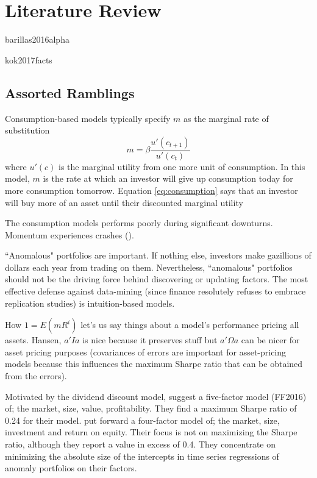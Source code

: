 
\section{Literature Review}

{barillas2016alpha}

{kok2017facts}

\subsection{Assorted Ramblings}

Consumption-based models typically specify $m$ as the marginal rate of 
substitution
\begin{equation}
\label{eq:consumption}
m=\beta\frac{u'(c_{t+1})}{u'(c_t)}
\end{equation}
where $u'(c)$ is the marginal utility from one more unit of consumption.
In this model, $m$ is the rate at which an investor will give up consumption 
today for more consumption tomorrow.
Equation \ref{eq:consumption} says that an investor will buy more of an asset 
until their discounted marginal utility

The consumption models performs poorly during significant downturns.
Momentum experiences crashes (\parencite{daniel2016momentum}).

``Anomalous" portfolios are important.
If nothing else, investors make gazillions of dollars each year from trading 
on them.
Nevertheless, ``anomalous" portfolios should not be the driving force behind 
discovering or updating factors.
The most effective defense against data-mining (since finance resolutely 
refuses to embrace replication studies) is intuition-based models.

How $1=E(mR^i)$ let's us say things about a model's performance pricing all 
assets.
Hansen, $a'Ia$ is nice because it preserves stuff but
$a'\Omega a$ can be nicer for asset pricing purposes (covariances of errors 
are important for asset-pricing models because this influences the maximum 
Sharpe ratio that can be obtained from the errors).

Motivated by the dividend discount model, \textcite{fama2016choosing} 
suggest a five-factor model (FF2016) of; the market, size, value, 
profitability.
They find a maximum Sharpe ratio of 0.24 for their model.
\textcite{hou2015digesting} put forward a four-factor model of; the market, 
size, 
investment and return on equity.
Their focus is not on maximizing the Sharpe ratio, although they report a 
value in excess of 0.4.
They concentrate on minimizing the absolute size of the intercepts in time 
series regressions of anomaly portfolios on their factors.

